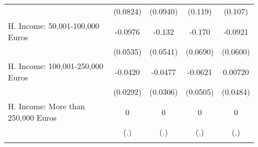 {\begin{tabular}{l*{4}{c}}
            &    (0.0824)         &    (0.0940)         &     (0.119)         &     (0.107)         \\
[1em]
H. Income: 50,001-100,000 Euros&     -0.0976         &      -0.132\sym{*}  &      -0.170\sym{*}  &     -0.0921         \\
            &    (0.0535)         &    (0.0541)         &    (0.0690)         &    (0.0600)         \\
[1em]
H. Income: 100,001-250,000 Euros&     -0.0420         &     -0.0477         &     -0.0621         &     0.00720         \\
            &    (0.0292)         &    (0.0306)         &    (0.0505)         &    (0.0484)         \\
[1em]
H. Income: More than 250,000 Euros&           0         &           0         &           0         &           0         \\
            &         (.)         &         (.)         &         (.)         &         (.)         \\
\hline\hline
{}\\
\end{tabular}
}
